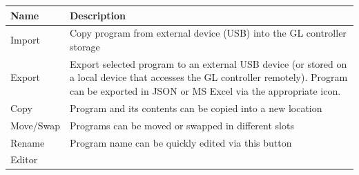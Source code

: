 \begin{longtable}[]{@{}ll@{}}
\toprule
\begin{minipage}[b]{0.20\columnwidth}\raggedright
Name\strut
\end{minipage} & \begin{minipage}[b]{0.74\columnwidth}\raggedright
Description\strut
\end{minipage}\tabularnewline
\midrule
\endhead
\begin{minipage}[t]{0.20\columnwidth}\raggedright
Import\strut
\end{minipage} & \begin{minipage}[t]{0.74\columnwidth}\raggedright
Copy program from external device (USB) into the GL controller
storage\strut
\end{minipage}\tabularnewline
\begin{minipage}[t]{0.20\columnwidth}\raggedright
Export\strut
\end{minipage} & \begin{minipage}[t]{0.74\columnwidth}\raggedright
Export selected program to an external USB device (or stored on a local
device that accesses the GL controller remotely). Program can be
exported in JSON or MS Excel via the appropriate icon.\strut
\end{minipage}\tabularnewline
\begin{minipage}[t]{0.20\columnwidth}\raggedright
Copy\strut
\end{minipage} & \begin{minipage}[t]{0.74\columnwidth}\raggedright
Program and its contents can be copied into a new location\strut
\end{minipage}\tabularnewline
\begin{minipage}[t]{0.20\columnwidth}\raggedright
Move/Swap\strut
\end{minipage} & \begin{minipage}[t]{0.74\columnwidth}\raggedright
Programs can be moved or swapped in different slots\strut
\end{minipage}\tabularnewline
\begin{minipage}[t]{0.20\columnwidth}\raggedright
Rename\strut
\end{minipage} & \begin{minipage}[t]{0.74\columnwidth}\raggedright
Program name can be quickly edited via this button\strut
\end{minipage}\tabularnewline
\begin{minipage}[t]{0.20\columnwidth}\raggedright
Editor\strut
\end{minipage} & \begin{minipage}[t]{0.74\columnwidth}\raggedright

\end{minipage}
\end{longtable}
